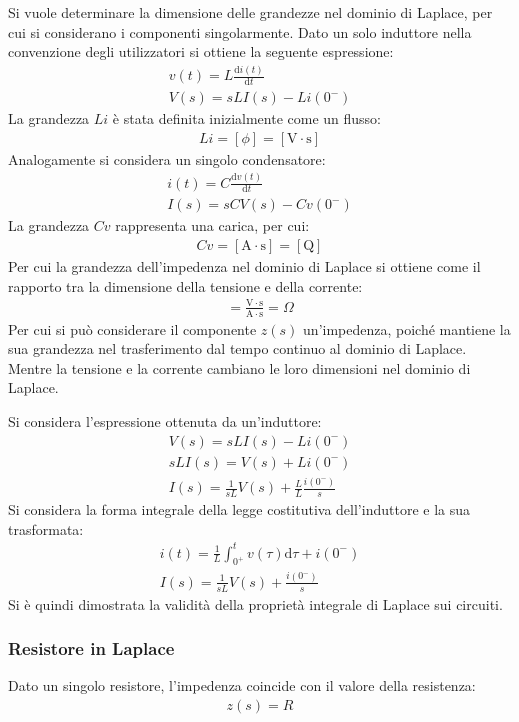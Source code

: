 \documentclass{article}
\newcommand{\df}{\mathrm{d}}
\newcommand{\SI}[1]{\mathrm{#1}}
\numberwithin{equation}{subsection}
\begin{document}
Si vuole determinare la dimensione delle grandezze nel dominio di Laplace, per cui si considerano i componenti singolarmente. Dato un solo induttore nella convenzione degli 
utilizzatori si ottiene la seguente espressione:
\begin{gather*}
    v(t)=L\displaystyle\frac{\df i(t)}{\df t}\\
    V(s)=sLI(s)-Li(0^-)
\end{gather*}
La grandezza $Li$ è stata definita inizialmente come un flusso:
\begin{gather*}
    Li=[\phi]=[\SI{V}\cdot \SI{s}]
\end{gather*}
Analogamente si considera un singolo condensatore:
\begin{gather*}
    i(t)=C\displaystyle\frac{\df v(t)}{\df t}\\
    I(s)=sCV(s)-Cv(0^-)
\end{gather*}
La grandezza $Cv$ rappresenta una carica, per cui:
\begin{gather*}
    Cv=[\SI{A}\cdot \SI{s}]=[\SI{Q}]
\end{gather*}
Per cui la grandezza dell'impedenza nel dominio di Laplace si ottiene come il rapporto tra la dimensione della tensione e della corrente:
\begin{gather*}
    [z]=\displaystyle\frac{\SI{V}\cdot \SI{s}}{\SI{A}\cdot \SI{s}}=\Omega
\end{gather*}
Per cui si può considerare il componente $z(s)$ un'impedenza, poiché mantiene la sua grandezza nel trasferimento dal tempo continuo al dominio di Laplace. Mentre la tensione 
e la corrente cambiano le loro dimensioni nel dominio di Laplace. 

Si considera l'espressione ottenuta da un'induttore:
\begin{gather*}
    V(s)=sLI(s)-Li(0^-)\\
    sLI(s)=V(s)+Li(0^-)\\
    I(s)=\displaystyle\frac{1}{sL}V(s)+\frac{L}{L}\frac{i(0^-)}{s}
\end{gather*}
Si considera la forma integrale della legge costitutiva dell'induttore e la sua trasformata:
\begin{gather*}
    i(t)=\displaystyle\frac{1}{L}\int_{0^+}^tv(\tau)\df\tau+i(0^-)\\
    I(s)=\displaystyle\frac{1}{sL}V(s)+\frac{i(0^-)}{s}
\end{gather*}
Si è quindi dimostrata la validità della proprietà integrale di Laplace sui circuiti. 

\subsubsection{Resistore in Laplace}
Dato un singolo resistore, l'impedenza coincide con il valore della resistenza:
\begin{gather*}
    z(s)=R
\end{gather*}
\end{document}
